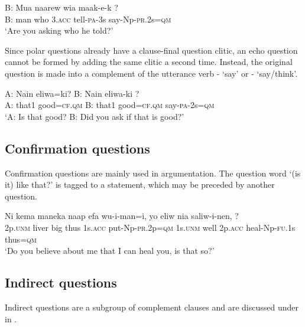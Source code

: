 \ea%
\label{ex:x1192}
\gll B:  Mua  naarew  wia  maak-e-k  ? \\
B:  man  who  3.\textsc{acc}  tell-\textsc{pa}-3s  say-Np-\textsc{pr}.2s=\textsc{qm}      \\
\glt `Are you asking who he told?'
\z





Since polar questions already have a clause-final question clitic, an echo question cannot be formed by adding the same clitic a second time. Instead, the original question is made into a complement of the utterance verb - `say' or - `say/think'. 

\ea%
\label{ex:x1193}
\gll A:  Nain  eliwa=ki?  B:  Nain  eliwa-ki  ? \\
A:  that1  good=\textsc{cf}.\textsc{qm}  B:  that1  good=\textsc{cf}.\textsc{qm}  say-\textsc{pa}-2s=\textsc{qm}      \\
\glt `A: Is that good?  B: Did you ask if that is good?'
\z





\subsection{Confirmation questions}
{}
Confirmation questions are mainly used in argumentation. The question word   `(is it) like that?' is tagged to a statement, which may be preceded by another question. 

\ea%
\label{ex:x1188}
\gll Ni  kema  maneka  naap  efa  wu-i-man=i, yo  eliw  nia  saliw-i-nen,  ? \\
2p.\textsc{unm}  liver  big  thus  1s.\textsc{acc}  put-Np-\textsc{pr}.2p=\textsc{qm}  1s.\textsc{unm}  well  2p.\textsc{acc}  heal-Np-\textsc{fu}.1s  thus=\textsc{qm}    \\
\glt `Do you believe about me that I can heal you, is that so?'
\z









\subsection{Indirect questions}
{}
Indirect questions are a subgroup of complement clauses and are discussed under  in  .

